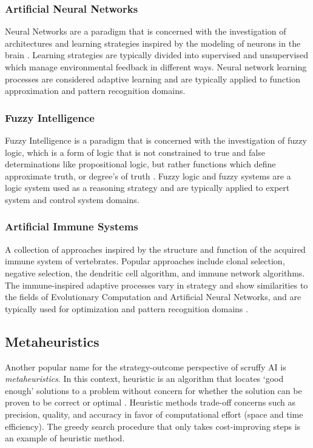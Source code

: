 \begin{bibunit}
\subsubsection{Artificial Neural Networks}
Neural Networks are a paradigm that is concerned with the investigation of architectures and learning strategies inspired by the modeling of neurons in the brain \cite{Bishop1995}. Learning strategies are typically divided into supervised and unsupervised which manage environmental feedback in different ways. Neural network learning processes are considered adaptive learning and are typically applied to function approximation and pattern recognition domains.

\subsubsection{Fuzzy Intelligence}
Fuzzy Intelligence is a paradigm that is concerned with the investigation of fuzzy logic, which is a form of logic that is not constrained to true and false determinations like propositional logic, but rather functions which define approximate truth, or degree’s of truth \cite{Zadeh1996}. Fuzzy logic and fuzzy systems are a logic system used as a reasoning strategy and are typically applied to expert system and control system domains.

\subsubsection{Artificial Immune Systems}
A collection of approaches inspired by the structure and function of the acquired immune system of vertebrates. Popular approaches include clonal selection, negative selection, the dendritic cell algorithm, and immune network algorithms. The immune-inspired adaptive processes vary in strategy and show similarities to the fields of Evolutionary Computation and Artificial Neural Networks, and are typically used for optimization and pattern recognition domains \cite{Castro2002}.  

% 
% 
\subsection{Metaheuristics}
\label{sec:metaheuristics}
Another popular name for the strategy-outcome perspective of scruffy AI is \emph{metaheuristics}. 
In this context, heuristic is an algorithm that locates `good enough' solutions to a problem without concern for whether the solution can be proven to be correct or optimal \cite{Michalewicz2004}. Heuristic methods trade-off concerns such as precision, quality, and accuracy in favor of computational effort (space and time efficiency). The greedy search procedure that only takes cost-improving steps is an example of heuristic method.


\end{bibunit}
